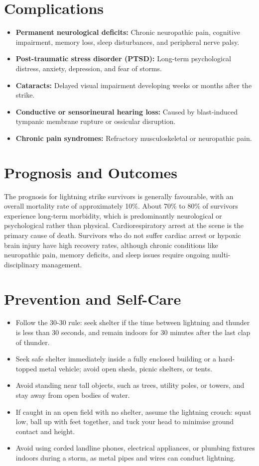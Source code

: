 \section*{Complications}
\begin{itemize}
    \item \textbf{Permanent neurological deficits:} Chronic neuropathic pain, cognitive impairment, memory loss, sleep disturbances, and peripheral nerve palsy.
    \item \textbf{Post-traumatic stress disorder (PTSD):} Long-term psychological distress, anxiety, depression, and fear of storms.
    \item \textbf{Cataracts:} Delayed visual impairment developing weeks or months after the strike.
    \item \textbf{Conductive or sensorineural hearing loss:} Caused by blast-induced tympanic membrane rupture or ossicular disruption.
    \item \textbf{Chronic pain syndromes:} Refractory musculoskeletal or neuropathic pain.
\end{itemize}

\section*{Prognosis and Outcomes}
The prognosis for lightning strike survivors is generally favourable, with an overall mortality rate of approximately 10\%. About 70\% to 80\% of survivors experience long-term morbidity, which is predominantly neurological or psychological rather than physical. Cardiorespiratory arrest at the scene is the primary cause of death. Survivors who do not suffer cardiac arrest or hypoxic brain injury have high recovery rates, although chronic conditions like neuropathic pain, memory deficits, and sleep issues require ongoing multi-disciplinary management.

\section*{Prevention and Self-Care}
\begin{itemize}
    \item Follow the 30-30 rule: seek shelter if the time between lightning and thunder is less than 30 seconds, and remain indoors for 30 minutes after the last clap of thunder.
    \item Seek safe shelter immediately inside a fully enclosed building or a hard-topped metal vehicle; avoid open sheds, picnic shelters, or tents.
    \item Avoid standing near tall objects, such as trees, utility poles, or towers, and stay away from open bodies of water.
    \item If caught in an open field with no shelter, assume the lightning crouch: squat low, ball up with feet together, and tuck your head to minimise ground contact and height.
    \item Avoid using corded landline phones, electrical appliances, or plumbing fixtures indoors during a storm, as metal pipes and wires can conduct lightning.
\end{itemize}

